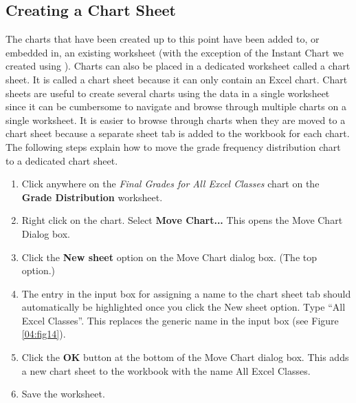 \subsection{Creating a Chart Sheet}

The charts that have been created up to this point have been added to, or embedded in, an existing worksheet (with the exception of the Instant Chart we created using ). Charts can also be placed in a dedicated worksheet called a chart sheet. It is called a chart sheet because it can only contain an Excel chart. Chart sheets are useful to create several charts using the data in a single worksheet since it can be cumbersome to navigate and browse through multiple charts on a single worksheet. It is easier to browse through charts when they are moved to a chart sheet because a separate sheet tab is added to the workbook for each chart. The following steps explain how to move the grade frequency distribution chart to a dedicated chart sheet.

\begin{enumerate}
	\item Click anywhere on the \textit{Final Grades for All Excel Classes} chart on the \textbf{Grade Distribution} worksheet.
	\item Right click on the chart. Select \textbf{Move Chart...} This opens the Move Chart Dialog box.
	\item Click the \textbf{New sheet} option on the Move Chart dialog box. (The top option.)
	\item The entry in the input box for assigning a name to the chart sheet tab should automatically be highlighted once you click the New sheet option. Type ``All Excel Classes''. This replaces the generic name in the input box (see Figure \ref{04:fig14}).
	\item Click the \textbf{OK} button at the bottom of the Move Chart dialog box. This adds a new chart sheet to the workbook with the name All Excel Classes.
	\item Save the worksheet.
\end{enumerate}

